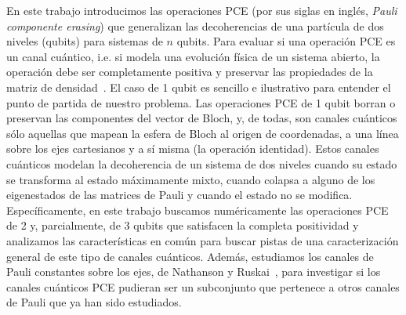En este trabajo introducimos las operaciones PCE (por sus siglas en inglés,
\textit{Pauli componente erasing}) que generalizan las decoherencias de una
partícula de dos niveles (qubits) para sistemas de $n$ qubits.  Para evaluar si
una operación PCE es un canal cuántico, i.e. si modela una evolución física de
un sistema abierto, la operación debe ser completamente positiva y preservar
las propiedades de la matriz de densidad~\citep{bengtsson_zyczkowski_2017}.  El
caso de 1 qubit es sencillo e ilustrativo para entender el punto de partida de
nuestro problema.  Las operaciones PCE de 1 qubit borran o preservan las
componentes del vector de Bloch, y, de todas, son canales cuánticos sólo
aquellas que mapean la esfera de Bloch al origen de coordenadas, a una línea
sobre los ejes cartesianos y a sí misma (la operación identidad). Estos canales
cuánticos modelan la decoherencia de un sistema de dos niveles cuando su estado
se transforma al estado máximamente mixto, cuando colapsa a alguno de los
eigenestados de las matrices de Pauli y cuando el estado no se modifica.
Específicamente, en este trabajo buscamos numéricamente las operaciones PCE de
2 y, parcialmente, de 3 qubits que satisfacen la completa positividad y
analizamos las características en común para buscar pistas de una
caracterización general de este tipo de canales cuánticos. Además, estudiamos
los canales de Pauli constantes sobre los ejes, de Nathanson y
Ruskai~\cite{nathanson2007pauli}, para investigar si los canales cuánticos PCE
pudieran ser un subconjunto que pertenece a otros canales de Pauli que ya han
sido estudiados. 



